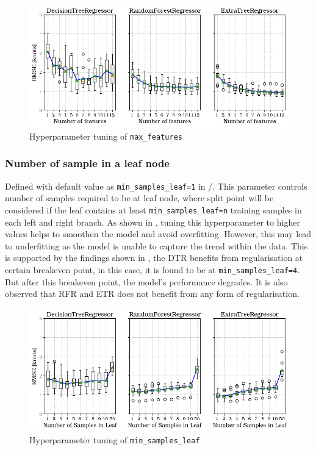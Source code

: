 \begin{figure}[h]
    \centering
        \includegraphics[width=.85\textwidth]{02_figures/hpo_n_features.png}
        \caption{Hyperparameter tuning of {\tt max\_features}}
        \label{fig:hpo_n_features}
\end{figure}

\subsubsection{Number of sample in a leaf node}\label{sec:min_samples_leaf}

Defined with default value as {\tt min\_samples\_leaf=1} in \scikit/. This parameter controls number of samples required to be at leaf node, where split point will be considered if the leaf contains at least {\tt min\_samples\_leaf=n} training samples in each left and right branch. As shown in , tuning this hyperparameter to higher values helps to smoothen the model and avoid overfitting. However, this may lead to underfitting as the model is unable to capture the trend within the data. This is supported by the findings shown in , the DTR benefits from regularisation at certain breakeven point, in this case, it is found to be at {\tt min\_samples\_leaf=4}. But after this breakeven point, the model's performance degrades. It is also observed that RFR and ETR does not benefit from any form of regularisation.  

\begin{figure}[h]
    \centering
        \includegraphics[width=.85\textwidth]{02_figures/hpo_min_samples_leaf.png}
        \caption{Hyperparameter tuning of {\tt min\_samples\_leaf}}
        \label{fig:hpo_min_samples_leaf}
\end{figure}

